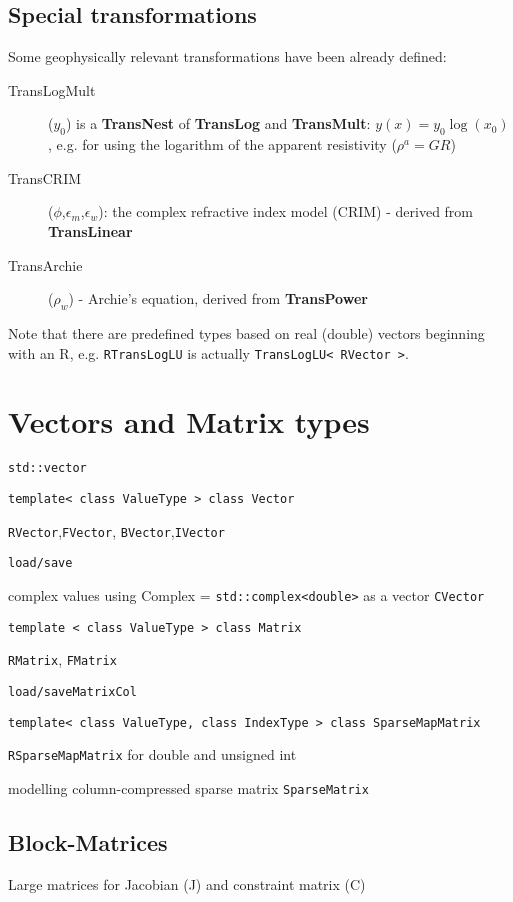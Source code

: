 \subsection*{Special transformations}
Some geophysically relevant transformations have been already defined:
\begin{description}
\item[TransLogMult]($y_0$) is a {\bf TransNest} of {\bf TransLog} and {\bf TransMult}: $y(x)=y_0\log(x_0)$, e.g. for using the logarithm of the apparent resistivity ($\rho^a=G R$)
\item[TransCRIM]($\phi$,$\epsilon_m$,$\epsilon_w$): the complex refractive index model (CRIM) - derived from {\bf TransLinear}
\item[TransArchie]($\rho_w$) - Archie's equation, derived from {\bf TransPower}
\end{description}

Note that there are predefined types based on real (double) vectors beginning with an R, e.g. \lstinline|RTransLogLU| is actually \lstinline|TransLogLU< RVector >|.


\section{Vectors and Matrix types}\label{app:matrix}
\sperre

\lstinline|std::vector|

\lstinline|template< class ValueType > class Vector|

\lstinline|RVector|,\lstinline|FVector|, \lstinline|BVector|,\lstinline|IVector|

\lstinline|load/save|

complex values using Complex = \lstinline|std::complex<double>| as a vector \lstinline|CVector|

\lstinline|template < class ValueType > class Matrix|

\lstinline|RMatrix|, \lstinline|FMatrix|

\lstinline|load/saveMatrixCol|

\lstinline|template< class ValueType, class IndexType > class SparseMapMatrix|

\lstinline|RSparseMapMatrix| for double and unsigned int

modelling column-compressed sparse matrix \lstinline|SparseMatrix|

\subsection{Block-Matrices}
Large matrices for Jacobian (J) and constraint matrix (C)

